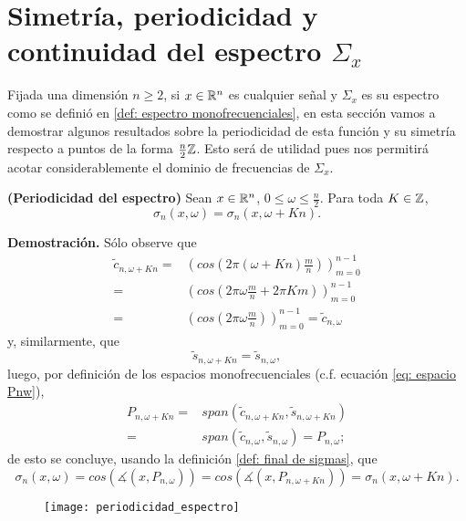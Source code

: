 \section{Simetría, periodicidad y continuidad del espectro $\Sigma_{x}$}

Fijada una dimensión $n \geq 2$,
si $x \in \mathbb{R}^{n}$ es cualquier señal y 
$\Sigma_{x}$
es su espectro como se definió en
\ref{def: espectro monofrecuenciales},
en esta sección vamos a demostrar 
algunos resultados sobre la periodicidad 
de esta función y su simetría 
respecto a puntos de la forma
$\frac{n}{2} \mathbb{Z}$.
Esto será de utilidad pues nos permitirá
acotar considerablemente el dominio de frecuencias
de $\Sigma_{x}$.



\begin{prop}
\label{prop: periodicidad espectro}
\textbf{(Periodicidad del espectro)}
Sean $x \in \mathbb{R}^{n}$, $0 \leq \omega \leq \frac{n}{2}$.
Para toda $K \in \mathbb{Z}$,
\[
\sigma_{n}(x, \omega) = \sigma_{n}(x, \omega + Kn).
\]
\end{prop}
\noindent
\textbf{Demostración.}
Sólo observe que 
\begin{align*}
\tilde{c}_{n, \omega + Kn} = & \left( cos \left( 2 \pi
\left( \omega + Kn \right) \frac{m}{n} \right) \right)_{m=0}^{n-1} \\
= & \left( cos \left( 
2 \pi \omega \frac{m}{n} + 2 \pi K m
\right) \right)_{m=0}^{n-1} \\
= & \left( cos \left( 
2 \pi \omega \frac{m}{n}
\right) \right)_{m=0}^{n-1} = \tilde{c}_{n, \omega}
\end{align*}
y, similarmente, que 
\[
\tilde{s}_{n, \omega + Kn} = \tilde{s}_{n, \omega},
\]
luego, por definición de los espacios monofrecuenciales
(c.f. ecuación \ref{eq: espacio Pnw}),
\begin{align*}
P_{n, \omega + Kn} =
& span(\tilde{c}_{n, \omega + Kn}, \tilde{s}_{n, \omega + Kn}) \\
= & span(\tilde{c}_{n, \omega }, \tilde{s}_{n, \omega }) = P_{n, \omega};
\end{align*}
de esto se concluye, usando la definición
\ref{def: final de sigmas},
que 
\[
\sigma_{n}(x, \omega) = 
cos (\measuredangle(x, P_{n, \omega}))
= cos (\measuredangle(x, P_{n, \omega + Kn})) = 
\sigma_{n}(x, \omega + Kn).
\]
\QEDB
\vspace{0.2cm}

\begin{figure}[H]
	\centering
	\texttt{[image: periodicidad\_espectro]} 
\end{figure}	


